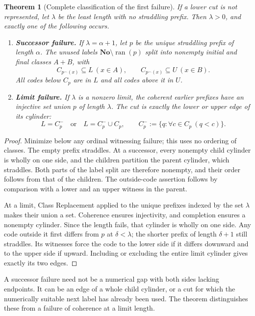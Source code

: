 \documentclass[11pt]{article}
\newtheorem{theorem}{Theorem}[section]
\theoremstyle{definition}
\theoremstyle{remark}
\newcommand{\No}{\mathbf{No}}
\newcommand{\ran}{\operatorname{ran}}
\newcommand{\cat}{\mathbin{{}^\frown}}
\begin{document}
\begin{theorem}[Complete classification of the first failure]
\label{swo:ds:thm:firstfailure}
If a lower cut is not represented, let $\lambda$ be the least length
with no straddling prefix. Then $\lambda>0$, and exactly one of the
following occurs.
\begin{enumerate}
\item \textbf{Successor failure.} If $\lambda=\alpha+1$, let $p$ be
the unique straddling prefix of length $\alpha$. The unused labels
$\No\setminus\ran(p)$ split into nonempty initial and final classes
$A+B$, with
\[
 C_{p\cat(x)}\subseteq L\ (x\in A),\qquad
 C_{p\cat(x)}\subseteq U\ (x\in B).
\]
All codes below $C_p$ are in $L$ and all codes above it in $U$.
\item \textbf{Limit failure.} If $\lambda$ is a nonzero limit, the
coherent earlier prefixes have an injective set union $p$ of length
$\lambda$. The cut is exactly the lower or upper edge of its cylinder:
\[
 L=C_p^-\quad\text{or}\quad L=C_p^-\cup C_p,
 \qquad C_p^-:=\{q:\forall c\in C_p\ (q<c)\}.
\]
\end{enumerate}
\end{theorem}
\begin{proof}
Minimize below any ordinal witnessing failure; this uses no ordering of
classes. The empty prefix straddles. At a successor, every nonempty
child cylinder is wholly on one side, and the children partition the
parent cylinder, which straddles. Both parts of the label split are
therefore nonempty, and their order follows from that of the children.
The outside-code assertion follows by comparison with a lower and an
upper witness in the parent.

At a limit, Class Replacement applied to the unique prefixes indexed
by the set $\lambda$ makes their union a set. Coherence ensures
injectivity, and completion ensures a nonempty cylinder. Since the
length fails, that cylinder is wholly on one side. Any code outside it
first differs from $p$ at $\delta<\lambda$; the shorter prefix of
length $\delta+1$ still straddles. Its witnesses force the code to the
lower side if it differs downward and to the upper side if upward.
Including or excluding the entire limit cylinder gives exactly its
two edges.
\end{proof}

A successor failure need not be a numerical gap with both sides lacking
endpoints. It can be an edge of a whole child cylinder, or a cut for which
the numerically suitable next label has already been used. The theorem
distinguishes these from a failure of coherence at a limit length.
\end{document}
